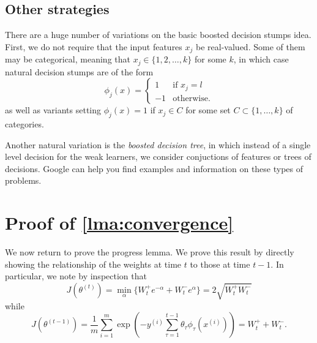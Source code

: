 \subsection{Other strategies}
There are a huge number of variations on the basic boosted decision stumps
idea. First, we do not require that the input features $x_j$ be real-valued. Some
of them may be categorical, meaning that $x_j \in \{1,2,\ldots,k\}$ for some $k$, in
which case natural decision stumps are of the form
\[
\phi_j (x) = \begin{cases}
    1 & \text{if } x_j = l\\    
    -1 & \text{otherwise.}
\end{cases}
\]
as well as variants setting $\phi_j (x) = 1$ if $x_j \in C$ for some set $C \subset \{1,\ldots,k\}$ of
categories.

Another natural variation is the \textit{boosted decision tree}, in which instead of a
single level decision for the weak learners, we consider conjuctions of features
or trees of decisions. Google can help you find examples and information on
these types of problems.

\section{Proof of \cref{lma:convergence}}\label{sec:boosting_proof}
We now return to prove the progress lemma. We prove this result by directly
showing the relationship of the weights at time $t$ to those at time $t - 1$. In
particular, we note by inspection that
\[
    J(\theta^{(t)} ) = \min_\alpha \{W^+_t e^{-\alpha} + W^-_t e^\alpha\} = 2\sqrt{W^+_t W^-_t}
\]
while
\[
    J(\theta^{(t-1)} ) = \frac{1}{m} \sum^m_{i=1} \exp\left(-y^{(i)}\sum_{\tau=1}^{t-1} \theta_\tau \phi_\tau (x^{(i)} )\right) = W^+_t + W^-_t.
\]

